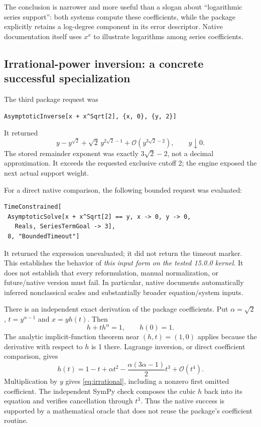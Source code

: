 \documentclass[11pt,a4paper]{article}
\newcommand{\code}[1]{\texttt{\detokenize{#1}}}
\newcommand{\OO}{\mathcal O}
\begin{document}
The conclusion is narrower and more useful than a slogan about ``logarithmic series support'': both systems compute these coefficients, while the package explicitly retains a log-degree component in its error descriptor. Native documentation itself uses $x^x$ to illustrate logarithms among series coefficients.\cite{wl-seriesdata}

\subsection{Irrational-power inversion: a concrete successful specialization}
The third package request was
\begin{lstlisting}
AsymptoticInverse[x + x^Sqrt[2], {x, 0}, {y, 2}]
\end{lstlisting}
It returned
\begin{equation}\label{eq:irrational}
 y-y^{\sqrt2}+\sqrt2\,y^{2\sqrt2-1}
 +\OO\!\left(y^{3\sqrt2-2}\right),\qquad y\downarrow0.
\end{equation}
The stored remainder exponent was exactly $3\sqrt2-2$, not a decimal approximation. It exceeds the requested exclusive cutoff 2; the engine exposed the next actual support weight.

For a direct native comparison, the following bounded request was evaluated:
\begin{lstlisting}
TimeConstrained[
 AsymptoticSolve[x + x^Sqrt[2] == y, x -> 0, y -> 0,
   Reals, SeriesTermGoal -> 3],
 8, "BoundedTimeout"]
\end{lstlisting}
It returned the \code{AsymptoticSolve} expression unevaluated; it did not return the timeout marker. This establishes the behavior of \emph{this input form on the tested 15.0.0 kernel}. It does not establish that every reformulation, manual normalization, or future/native version must fail. In particular, native \code{AsymptoticSolve} documents automatically inferred nonclassical scales and substantially broader equation/system inputs.\cite{wl-solve}

There is an independent exact derivation of the package coefficients. Put $\alpha=\sqrt2$, $t=y^{\alpha-1}$ and $x=yh(t)$. Then
\begin{equation}
 h+t h^\alpha=1,\qquad h(0)=1.
\end{equation}
The analytic implicit-function theorem near $(h,t)=(1,0)$ applies because the derivative with respect to $h$ is 1 there. Lagrange inversion, or direct coefficient comparison, gives
\begin{equation}
 h(t)=1-t+\alpha t^2-\frac{\alpha(3\alpha-1)}{2}t^3+\OO(t^4).
\end{equation}
Multiplication by $y$ gives \eqref{eq:irrational}, including a nonzero first omitted coefficient. The independent SymPy check composes the cubic $h$ back into its equation and verifies cancellation through $t^3$. Thus the native success is supported by a mathematical oracle that does not reuse the package's coefficient routine.
\end{document}
